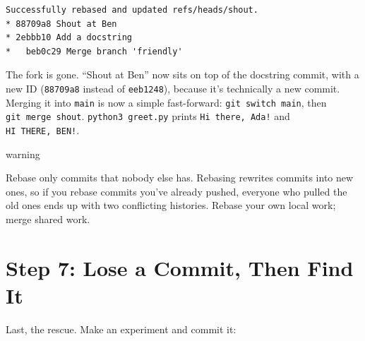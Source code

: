 \begin{codeblock}
\begin{Verbatim}[formatcom=\outputstyle]
Successfully rebased and updated refs/heads/shout.
* 88709a8 Shout at Ben
* 2ebbb10 Add a docstring
*   beb0c29 Merge branch 'friendly'
\end{Verbatim}
\end{codeblock}

The fork is gone. ``Shout at Ben'' now sits on top of the docstring commit, with a new ID (\texttt{88709a8} instead of \texttt{eeb1248}), because it's technically a new commit. Merging it into \texttt{main} is now a simple fast-forward: \texttt{git\ switch\ main}, then \texttt{git\ merge\ shout}. \texttt{python3\ greet.py} prints \texttt{Hi\ there,\ Ada!} and \texttt{HI\ THERE,\ BEN!}.

\begin{callout}{warning}

Rebase only commits that nobody else has. Rebasing rewrites commits into new ones, so if you rebase commits you've already pushed, everyone who pulled the old ones ends up with two conflicting histories. Rebase your own local work; merge shared work.

\end{callout}


\section{Step 7: Lose a Commit, Then Find It}\label{10-lab-try-an-idea-without-breaking-anything:step-7-lose-a-commit-then-find-it}

Last, the rescue. Make an experiment and commit it:

\begin{codeblock}

\begin{Shaded}
\begin{Highlighting}[]
  \OperatorTok{\textgreater{}\textgreater{}}
 
\end{Highlighting}
\end{Shaded}

\end{codeblock}

